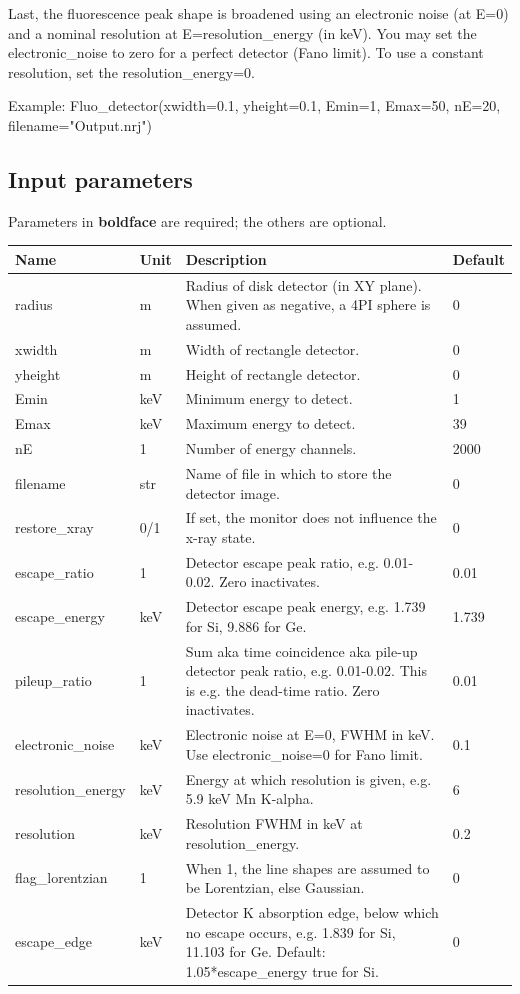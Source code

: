 Last, the fluorescence peak shape is broadened using an electronic noise (at E=0) and a nominal resolution at E=resolution\_energy (in keV). You may set the electronic\_noise to zero for a perfect detector (Fano limit). To use a constant resolution, set the resolution\_energy=0.

Example: Fluo\_detector(xwidth=0.1, yheight=0.1, Emin=1, Emax=50, nE=20, filename="Output.nrj")

\subsection*{Input parameters}
Parameters in \textbf{boldface} are required; the others are optional.

\begin{longtable}{p{}p{}p{}p{}}
\toprule
\textbf{Name} & \textbf{Unit} & \textbf{Description} & \textbf{Default} \\
\midrule
\endhead
radius & m & Radius of disk detector (in XY plane). When given as negative, a 4PI sphere is assumed. & 0 \\
xwidth & m & Width  of rectangle detector. & 0 \\
yheight & m & Height of rectangle detector. & 0 \\
Emin & keV & Minimum energy to detect. & 1 \\
Emax & keV & Maximum energy to detect. & 39 \\
nE & 1 & Number of energy channels. & 2000 \\
filename & str & Name of file in which to store the detector image. & 0 \\
restore\_xray & 0/1 & If set, the monitor does not influence the x-ray state. & 0 \\
escape\_ratio & 1 & Detector escape peak ratio,  e.g. 0.01-0.02. Zero inactivates. & 0.01 \\
escape\_energy & keV & Detector escape peak energy, e.g. 1.739 for Si, 9.886 for Ge. & 1.739 \\
pileup\_ratio & 1 & Sum aka time coincidence aka pile-up detector peak ratio, e.g. 0.01-0.02. This is e.g. the dead-time ratio. Zero inactivates. & 0.01 \\
electronic\_noise & keV & Electronic noise at E=0, FWHM in keV. Use electronic\_noise=0 for Fano limit. & 0.1 \\
resolution\_energy & keV & Energy at which resolution is given, e.g. 5.9 keV Mn K-alpha. & 6 \\
resolution & keV & Resolution FWHM in keV at resolution\_energy. & 0.2 \\
flag\_lorentzian & 1 & When 1, the line shapes are assumed to be Lorentzian, else Gaussian. & 0 \\
escape\_edge & keV & Detector K absorption edge, below which no escape occurs, e.g. 1.839 for Si, 11.103 for Ge. Default: 1.05*escape\_energy true for Si. & 0 \\
\bottomrule
\end{longtable}

